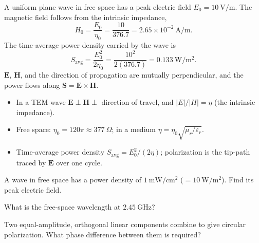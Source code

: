 \begin{workedexample}
A uniform plane wave in free space has a peak electric field
$E_0 = 10\ \mathrm{V/m}$. The magnetic field follows from the intrinsic impedance,
\[ H_0 = \frac{E_0}{\eta_0} = \frac{10}{376.7} = 2.65\times10^{-2}\ \mathrm{A/m}. \]
The time-average power density carried by the wave is
\[ S_{\text{avg}} = \frac{E_0^{2}}{2\eta_0} = \frac{10^{2}}{2(376.7)}
   = 0.133\ \mathrm{W/m^{2}}. \]
$\mathbf{E}$, $\mathbf{H}$, and the direction of propagation are mutually
perpendicular, and the power flows along $\mathbf{S} = \mathbf{E}\times\mathbf{H}$.
\end{workedexample}

\begin{keytakeaways}
\begin{itemize}[leftmargin=1.4em,itemsep=2pt]
\item In a TEM wave $\mathbf{E}\perp\mathbf{H}\perp$ direction of travel, and
$|E|/|H| = \eta$ (the intrinsic impedance).
\item Free space: $\eta_0 = 120\pi \approx 377\ \Omega$; in a medium
$\eta = \eta_0\sqrt{\mu_r/\varepsilon_r}$.
\item Time-average power density $S_{\text{avg}} = E_0^{2}/(2\eta)$; polarization is
the tip-path traced by $\mathbf{E}$ over one cycle.
\end{itemize}
\end{keytakeaways}

\begin{exercises}
\item A wave in free space has a power density of $1\ \mathrm{mW/cm^{2}}$
($=10\ \mathrm{W/m^{2}}$). Find its peak electric field.
\item What is the free-space wavelength at $2.45\ \mathrm{GHz}$?
\item Two equal-amplitude, orthogonal linear components combine to give circular
polarization. What phase difference between them is required?
\end{exercises}

